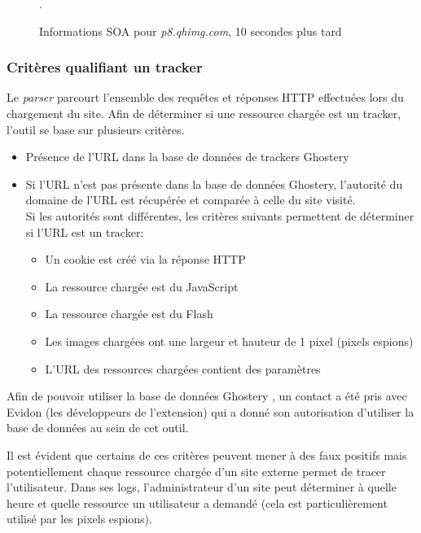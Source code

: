 \begin{figure}[h]
	\centering
	
	\caption{\label{dig_p8.qhimg.com_2}Informations SOA pour \textit{p8.qhimg.com}, 10 secondes plus tard}.
\end{figure}

\subsubsection{Critères qualifiant un tracker}
Le \textit{parser} parcourt l'ensemble des requêtes et réponses HTTP effectuées lors du chargement du site. Afin de déterminer si une ressource chargée est un tracker, l'outil se base sur plusieurs critères.
\begin{itemize}
  \renewcommand{\labelitemi}{$\Rightarrow$}
 \item Présence de l'URL dans la base de données de trackers Ghostery
 \item Si l'URL n'est pas présente dans la base de données Ghostery, l'autorité du domaine de l'URL est récupérée et comparée à celle du site visité.\\
		Si les autorités sont différentes, les critères suivants permettent de déterminer si l'URL est un tracker:
		\begin{itemize}
			\item Un cookie est créé via la réponse HTTP
			\item La ressource chargée est du JavaScript
			\item La ressource chargée est du Flash
			\item Les images chargées ont une largeur et hauteur de 1 pixel (pixels espions)
			\item L'URL des ressources chargées contient des paramètres
			\newline
		\end{itemize}
\end{itemize}

Afin de pouvoir utiliser la base de données Ghostery \cite{ghostery_homepage}, un contact a été pris avec Evidon (les développeurs de l'extension) qui a donné son autorisation d'utiliser la base de données au sein de cet outil.
\newline

Il est évident que certains de ces critères peuvent mener à des faux positifs mais potentiellement chaque ressource chargée d'un site externe permet de tracer l'utilisateur. Dans ses logs, l'administrateur d'un site peut déterminer à quelle heure et quelle ressource un utilisateur a demandé (cela est particulièrement utilisé par les pixels espions).

